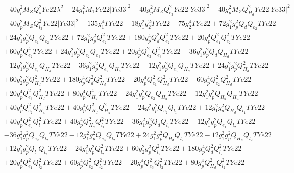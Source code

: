 \begin{align}
 &-40 g_{p}^{2} M_Z Q_{s}^{2} Ye22 \lambda^{2} -24 g_{1}^{2} M_1 Ye22 |Ye33|^2 -40 g_{p}^{2} M_Z Q_{e_3}^{2} Ye22 |Ye33|^2 +40 g_{p}^{2} M_Z Q_{H_d}^{2} Ye22 |Ye33|^2 \nonumber \\ 
 &-40 g_{p}^{2} M_Z Q_{l_3}^{2} Ye22 |Ye33|^2 +135 g_{1}^{4} TYe22 +18 g_{1}^{2} g_{2}^{2} TYe22 +75 g_{2}^{4} TYe22 +72 g_{1}^{2} g_{p}^{2} Q_{d} Q_{e_{2}} TYe22 \nonumber \\ 
 &+24 g_{1}^{2} g_{p}^{2} Q_{e_{1}} Q_{e_{2}} TYe22 +72 g_{1}^{2} g_{p}^{2} Q_{e_{2}}^{2} TYe22 +180 g_{p}^{4} Q_{d}^{2} Q_{e_{2}}^{2} TYe22 +20 g_{p}^{4} Q_{e_{1}}^{2} Q_{e_{2}}^{2} TYe22 \nonumber \\ 
 &+60 g_{p}^{4} Q_{e_{2}}^{4} TYe22 +24 g_{1}^{2} g_{p}^{2} Q_{e_{2}} Q_{e_3} TYe22 +20 g_{p}^{4} Q_{e_{2}}^{2} Q_{e_3}^{2} TYe22 -36 g_{1}^{2} g_{p}^{2} Q_{d} Q_{H_d} TYe22 \nonumber \\ 
 &-12 g_{1}^{2} g_{p}^{2} Q_{e_{1}} Q_{H_d} TYe22 -36 g_{1}^{2} g_{p}^{2} Q_{e_{2}} Q_{H_d} TYe22 -12 g_{1}^{2} g_{p}^{2} Q_{e_3} Q_{H_d} TYe22 +24 g_{1}^{2} g_{p}^{2} Q_{H_d}^{2} TYe22 \nonumber \\ 
 &+60 g_{2}^{2} g_{p}^{2} Q_{H_d}^{2} TYe22 +180 g_{p}^{4} Q_{d}^{2} Q_{H_d}^{2} TYe22 +20 g_{p}^{4} Q_{e_{1}}^{2} Q_{H_d}^{2} TYe22 +60 g_{p}^{4} Q_{e_{2}}^{2} Q_{H_d}^{2} TYe22 \nonumber \\ 
 &+20 g_{p}^{4} Q_{e_3}^{2} Q_{H_d}^{2} TYe22 +80 g_{p}^{4} Q_{H_d}^{4} TYe22 +24 g_{1}^{2} g_{p}^{2} Q_{e_{2}} Q_{H_u} TYe22 -12 g_{1}^{2} g_{p}^{2} Q_{H_d} Q_{H_u} TYe22 \nonumber \\ 
 &+40 g_{p}^{4} Q_{e_{2}}^{2} Q_{H_u}^{2} TYe22 +40 g_{p}^{4} Q_{H_d}^{2} Q_{H_u}^{2} TYe22 -24 g_{1}^{2} g_{p}^{2} Q_{e_{2}} Q_{l_1} TYe22 +12 g_{1}^{2} g_{p}^{2} Q_{H_d} Q_{l_1} TYe22 \nonumber \\ 
 &+40 g_{p}^{4} Q_{e_{2}}^{2} Q_{l_1}^{2} TYe22 +40 g_{p}^{4} Q_{H_d}^{2} Q_{l_1}^{2} TYe22 -36 g_{1}^{2} g_{p}^{2} Q_{d} Q_{l_2} TYe22 -12 g_{1}^{2} g_{p}^{2} Q_{e_{1}} Q_{l_2} TYe22 \nonumber \\ 
 &-36 g_{1}^{2} g_{p}^{2} Q_{e_{2}} Q_{l_2} TYe22 -12 g_{1}^{2} g_{p}^{2} Q_{e_3} Q_{l_2} TYe22 +24 g_{1}^{2} g_{p}^{2} Q_{H_d} Q_{l_2} TYe22 -12 g_{1}^{2} g_{p}^{2} Q_{H_u} Q_{l_2} TYe22 \nonumber \\ 
 &+12 g_{1}^{2} g_{p}^{2} Q_{l_1} Q_{l_2} TYe22 +24 g_{1}^{2} g_{p}^{2} Q_{l_2}^{2} TYe22 +60 g_{2}^{2} g_{p}^{2} Q_{l_2}^{2} TYe22 +180 g_{p}^{4} Q_{d}^{2} Q_{l_2}^{2} TYe22 \nonumber \\ 
 &+20 g_{p}^{4} Q_{e_{1}}^{2} Q_{l_2}^{2} TYe22 +60 g_{p}^{4} Q_{e_{2}}^{2} Q_{l_2}^{2} TYe22 +20 g_{p}^{4} Q_{e_3}^{2} Q_{l_2}^{2} TYe22 +80 g_{p}^{4} Q_{H_d}^{2} Q_{l_2}^{2} TYe22 \nonumber \\ 

\end{align}
